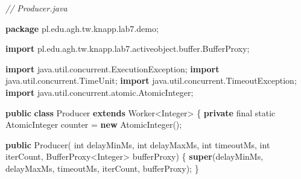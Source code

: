 \documentclass[11pt]{article}
\newenvironment{Shaded}{}{}
\newcommand{\KeywordTok}[1]{\textcolor[rgb]{0.00,0.44,0.13}{\textbf{{#1}}}}
\newcommand{\DataTypeTok}[1]{\textcolor[rgb]{0.56,0.13,0.00}{{#1}}}
\newcommand{\CommentTok}[1]{\textcolor[rgb]{0.38,0.63,0.69}{\textit{{#1}}}}
\newcommand{\FunctionTok}[1]{\textcolor[rgb]{0.02,0.16,0.49}{{#1}}}
\newcommand{\NormalTok}[1]{{#1}}
\newcommand{\ImportTok}[1]{{#1}}
\newcommand{\OperatorTok}[1]{\textcolor[rgb]{0.40,0.40,0.40}{{#1}}}
\newcommand{\BuiltInTok}[1]{{#1}}
\begin{document}
\begin{Shaded}
\begin{Highlighting}[]
\CommentTok{// Producer.java}

\KeywordTok{package}\ImportTok{ pl}\OperatorTok{.}\ImportTok{edu}\OperatorTok{.}\ImportTok{agh}\OperatorTok{.}\ImportTok{tw}\OperatorTok{.}\ImportTok{knapp}\OperatorTok{.}\ImportTok{lab7}\OperatorTok{.}\ImportTok{demo}\OperatorTok{;}

\KeywordTok{import} \ImportTok{pl}\OperatorTok{.}\ImportTok{edu}\OperatorTok{.}\ImportTok{agh}\OperatorTok{.}\ImportTok{tw}\OperatorTok{.}\ImportTok{knapp}\OperatorTok{.}\ImportTok{lab7}\OperatorTok{.}\ImportTok{activeobject}\OperatorTok{.}\ImportTok{buffer}\OperatorTok{.}\ImportTok{BufferProxy}\OperatorTok{;}

\KeywordTok{import} \ImportTok{java}\OperatorTok{.}\ImportTok{util}\OperatorTok{.}\ImportTok{concurrent}\OperatorTok{.}\ImportTok{ExecutionException}\OperatorTok{;}
\KeywordTok{import} \ImportTok{java}\OperatorTok{.}\ImportTok{util}\OperatorTok{.}\ImportTok{concurrent}\OperatorTok{.}\ImportTok{TimeUnit}\OperatorTok{;}
\KeywordTok{import} \ImportTok{java}\OperatorTok{.}\ImportTok{util}\OperatorTok{.}\ImportTok{concurrent}\OperatorTok{.}\ImportTok{TimeoutException}\OperatorTok{;}
\KeywordTok{import} \ImportTok{java}\OperatorTok{.}\ImportTok{util}\OperatorTok{.}\ImportTok{concurrent}\OperatorTok{.}\ImportTok{atomic}\OperatorTok{.}\ImportTok{AtomicInteger}\OperatorTok{;}

\KeywordTok{public} \KeywordTok{class}\NormalTok{ Producer }\KeywordTok{extends}\NormalTok{ Worker}\OperatorTok{\textless{}}\BuiltInTok{Integer}\OperatorTok{\textgreater{}} \OperatorTok{\{}
    \KeywordTok{private} \DataTypeTok{final} \DataTypeTok{static} \BuiltInTok{AtomicInteger}\NormalTok{ counter }\OperatorTok{=} \KeywordTok{new} \BuiltInTok{AtomicInteger}\OperatorTok{();}

    \KeywordTok{public} \FunctionTok{Producer}\OperatorTok{(}
        \DataTypeTok{int}\NormalTok{ delayMinMs}\OperatorTok{,} \DataTypeTok{int}\NormalTok{ delayMaxMs}\OperatorTok{,}
        \DataTypeTok{int}\NormalTok{ timeoutMs}\OperatorTok{,} \DataTypeTok{int}\NormalTok{ iterCount}\OperatorTok{,}
\NormalTok{        BufferProxy}\OperatorTok{\textless{}}\BuiltInTok{Integer}\OperatorTok{\textgreater{}}\NormalTok{ bufferProxy}\OperatorTok{)}
    \OperatorTok{\{}
        \KeywordTok{super}\OperatorTok{(}\NormalTok{delayMinMs}\OperatorTok{,}\NormalTok{ delayMaxMs}\OperatorTok{,}\NormalTok{ timeoutMs}\OperatorTok{,}\NormalTok{ iterCount}\OperatorTok{,}\NormalTok{ bufferProxy}\OperatorTok{);}
    \OperatorTok{\}}


\end{Highlighting}
\end{Shaded}
\end{document}
